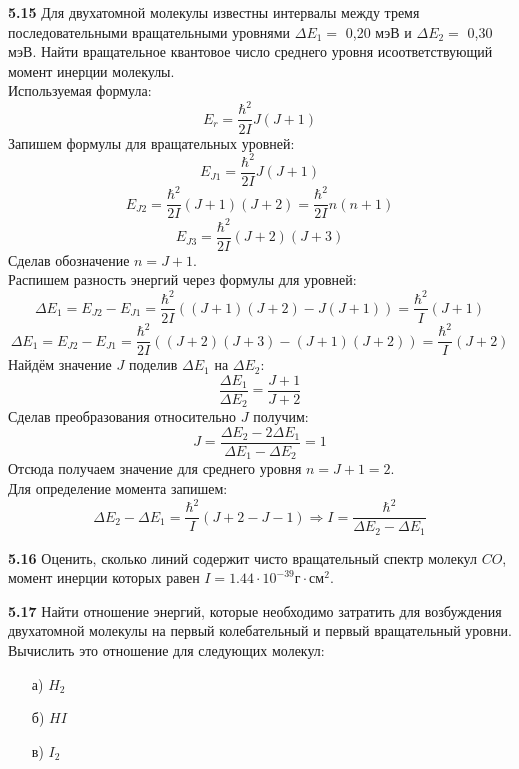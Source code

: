 	\textbf{5.15 }
		Для двухатомной молекулы известны интервалы между тремя
		последовательными вращательными уровнями \( \Delta E_1 = \) 0,20 мэВ и
		\(\Delta E_2 = \) 0,30 мэВ. Найти вращательное квантовое число 
		среднего уровня исоответствующий момент инерции молекулы. \\
		Используемая формула: \[ E_r = \frac{\hbar^2}{2I}J(J+1) \]
		Запишем формулы для вращательных уровней:
		\[ E_{J1} = \frac{\hbar^2}{2I}J(J+1) \]
		\[ E_{J2} = \frac{\hbar^2}{2I}(J+1)(J+2) = \frac{\hbar^2}{2I}n(n+1) \]
		\[ E_{J3} = \frac{\hbar^2}{2I}(J+2)(J+3) \]
		Сделав обозначение \( n = J + 1 \). \\
		Распишем разность энергий через формулы для уровней:
		\[ 
			\Delta E_1 = E_{J2} - E_{J1} = 
			\frac{\hbar^2}{2I}((J+1)(J+2) - J(J+1)) = \frac{\hbar^2}{I}(J+1) 
		\]
		\[ 
			\Delta E_1 = E_{J2} - E_{J1} =
			\frac{\hbar^2}{2I}((J+2)(J+3)-(J+1)(J+2)) = \frac{\hbar^2}{I}(J+2)
		\]
		Найдём значение \( J \) поделив \( \Delta E_1 \) на \( \Delta E_2 \):
		\[ \frac{\Delta E_1}{\Delta E_2} = \frac{J+1}{J+2} \]
		Сделав преобразования относительно \( J \) получим:
		\[ J = \frac{\Delta E_2 - 2\Delta E_1}{\Delta E_1 - \Delta E_2} = 1 \]
		Отсюда получаем значение для среднего уровня \( n = J+1 = 2 \). \\
		Для определение момента запишем: 
		\[ 
			\Delta E_2 - \Delta E_1 = \frac{\hbar^2}{I}(J+2-J-1) 
			\Rightarrow I = \frac{\hbar^2}{\Delta E_2 - \Delta E_1}
		\]

	\textbf{5.16 }
		Оценить, сколько линий содержит чисто вращательный спектр молекул
		\( CO \), момент инерции которых равен 
		\( I = 1.44\cdot10^{-39} \text{г}\cdot\text{см}^2 \).

	\textbf{5.17 }
		Найти отношение энергий, которые необходимо затратить для
		возбуждения двухатомной молекулы на первый колебательный и первый
		вращательный уровни. Вычислить это отношение для следующих молекул:
		\vspace*{-1em} 
		\begin{itemize}\itemsep-8pt
			\item[а)] \( H_2 \)
			\item[б)] \( HI \)
			\item[в)] \( I_2 \)
		\end{itemize}
